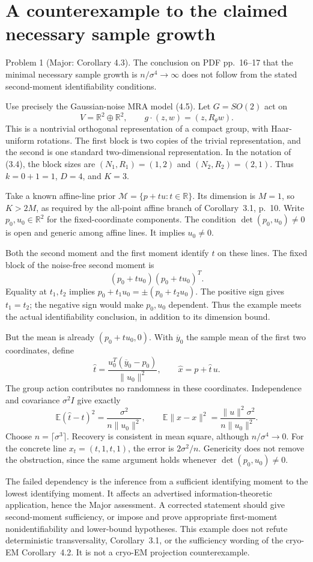 \documentclass[10pt]{article}
\begin{document}
\section*{A counterexample to the claimed necessary sample growth}
Problem 1 (Major: Corollary 4.3).  The conclusion on PDF pp. 16–17 that the minimal necessary sample growth is \(n/\sigma^4\to\infty\) does not follow from the stated second-moment identifiability conditions.\par
Use precisely the Gaussian-noise MRA model (4.5). Let \(G=SO(2)\) act on \[V=\mathbb R^2\oplus\mathbb R^2,\qquad
 g\cdot(z,w)=(z,R_\theta w).\] This is a nontrivial orthogonal representation of a compact group, with Haar-uniform rotations. The first block is two copies of the trivial representation, and the second is one standard two-dimensional representation. In the notation of (3.4), the block sizes are \((N_1,R_1)=(1,2)\) and \((N_2,R_2)=(2,1)\). Thus \(k=0+1=1\), \(D=4\), and \(K=3\).\par
Take a known affine-line prior \(\mathcal M=\{p+tu:t\in\mathbb R\}\). Its dimension is \(M=1\), so \(K>2M\), as required by the all-point affine branch of Corollary 3.1, p. 10. Write \(p_0,u_0\in\mathbb R^2\) for the fixed-coordinate components. The condition \(\det(p_0,u_0)\ne0\) is open and generic among affine lines. It implies \(u_0\ne0\).\par
Both the second moment and the first moment identify \(t\) on these lines. The fixed block of the noise-free second moment is \[(p_0+tu_0)(p_0+tu_0)^T.\] Equality at \(t_1,t_2\) implies \(p_0+t_1u_0=\pm(p_0+t_2u_0)\). The positive sign gives \(t_1=t_2\); the negative sign would make \(p_0,u_0\) dependent. Thus the example meets the actual identifiability conclusion, in addition to its dimension bound.\par
But the mean is already \((p_0+tu_0,0)\). With \(\overline y_0\) the sample mean of the first two coordinates, define \[\widehat t=\frac{u_0^T(\overline y_0-p_0)}{\|u_0\|^2},
 \qquad \widehat x=p+\widehat t\,u.\] The group action contributes no randomness in these coordinates. Independence and covariance \(\sigma^2 I\) give exactly \[\mathbb E(\widehat t-t)^2=\frac{\sigma^2}{n\|u_0\|^2},
 \qquad
 \mathbb E\|\widehat x-x\|^2
   =\frac{\|u\|^2\sigma^2}{n\|u_0\|^2}.\] Choose \(n=\lceil\sigma^3\rceil\). Recovery is consistent in mean square, although \(n/\sigma^4\to0\). For the concrete line \(x_t=(t,1,t,1)\), the error is \(2\sigma^2/n\). Genericity does not remove the obstruction, since the same argument holds whenever \(\det(p_0,u_0)\ne0\).\par
The failed dependency is the inference from a sufficient identifying moment to the lowest identifying moment. It affects an advertised information-theoretic application, hence the Major assessment. A corrected statement should give second-moment sufficiency, or impose and prove appropriate first-moment nonidentifiability and lower-bound hypotheses. This example does not refute deterministic transversality, Corollary 3.1, or the sufficiency wording of the cryo-EM Corollary 4.2. It is not a cryo-EM projection counterexample.\par
\end{document}

